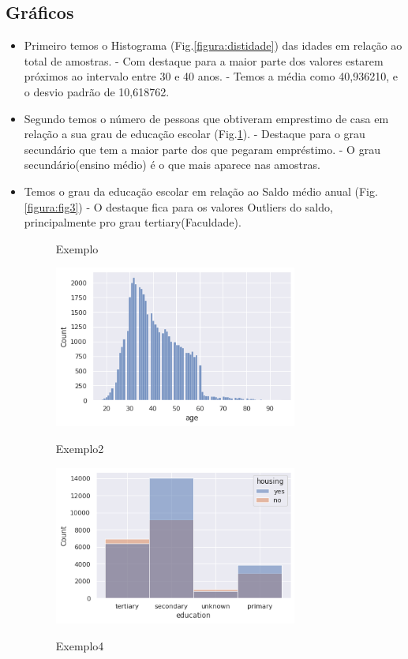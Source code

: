 \documentclass[conference]{IEEEtran}
\begin{document}
\subsection{Gráficos}
\begin{itemize}
	\item[(1)] 	Primeiro temos o Histograma (Fig.\ref{figura:distidade}) das idades em relação ao total de amostras.
	\subitem- 	Com destaque para a maior parte dos valores estarem próximos ao intervalo  entre 30 e 40 anos.
	\subitem- 	Temos a média como 40,936210, e o desvio padrão de 10,618762.
	\item[(2)] Segundo temos o número de pessoas que obtiveram emprestimo de casa em relação a sua grau de educação escolar (Fig.\ref{figura:fig2}).
	\subitem- 	Destaque para o grau secundário que tem a maior parte dos que pegaram empréstimo.
	\subitem-		O grau secundário(ensino médio) é o que mais aparece nas amostras.
	\item[(3)] Temos o grau da educação escolar em relação ao Saldo médio anual (Fig.\ref{figura:fig3}) 
	\subitem-		O destaque fica para os valores Outliers do saldo, principalmente pro grau tertiary(Faculdade).
	\begin{figure}[h]
		\caption{Exemplo}
		\centering %
		\includegraphics[width=8cm]{IMGS/img1.png}
		\label{figura:distidade}
		\caption{Exemplo2}
		\includegraphics[width=8cm]{IMGS/img2.png}
		\label{figura:fig2}
		\caption{Exemplo4}
		\centering %

\end{figure}
\end{itemize}
\end{document}
